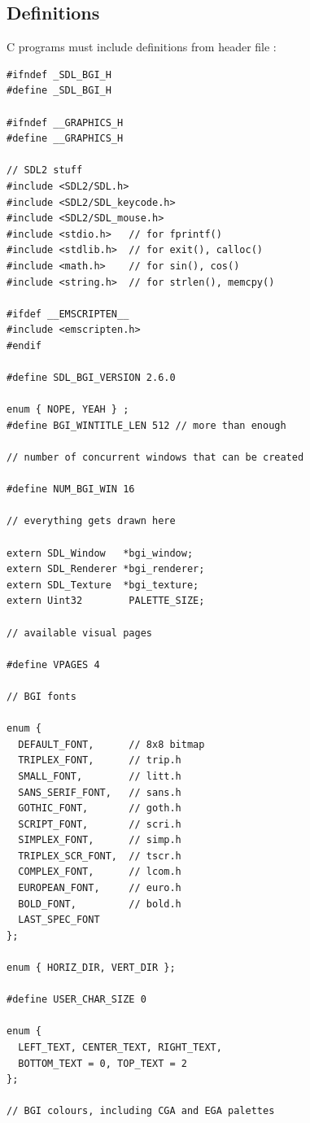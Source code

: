 \documentclass[a4paper,12pt]{article}
\newcommand{\ntt}[1]{\texttt{\textls[-40]{#1}}}
\newcommand{\F}[1]{\ntt{#1}}     %
\begin{document}

\subsection{Definitions}

C programs must include definitions from header file \F{SDL\_bgi.h}:

\begin{footnotesize}
\begin{spacing}{0.8}
\begin{verbatim}
#ifndef _SDL_BGI_H
#define _SDL_BGI_H

#ifndef __GRAPHICS_H
#define __GRAPHICS_H

// SDL2 stuff
#include <SDL2/SDL.h>
#include <SDL2/SDL_keycode.h>
#include <SDL2/SDL_mouse.h>
#include <stdio.h>   // for fprintf()
#include <stdlib.h>  // for exit(), calloc()
#include <math.h>    // for sin(), cos()
#include <string.h>  // for strlen(), memcpy()

#ifdef __EMSCRIPTEN__
#include <emscripten.h>
#endif

#define SDL_BGI_VERSION 2.6.0

enum { NOPE, YEAH } ;
#define BGI_WINTITLE_LEN 512 // more than enough

// number of concurrent windows that can be created

#define NUM_BGI_WIN 16

// everything gets drawn here

extern SDL_Window   *bgi_window;
extern SDL_Renderer *bgi_renderer;
extern SDL_Texture  *bgi_texture;
extern Uint32        PALETTE_SIZE;

// available visual pages

#define VPAGES 4

// BGI fonts

enum {
  DEFAULT_FONT,      // 8x8 bitmap
  TRIPLEX_FONT,      // trip.h
  SMALL_FONT,        // litt.h
  SANS_SERIF_FONT,   // sans.h
  GOTHIC_FONT,       // goth.h
  SCRIPT_FONT,       // scri.h
  SIMPLEX_FONT,      // simp.h
  TRIPLEX_SCR_FONT,  // tscr.h
  COMPLEX_FONT,      // lcom.h
  EUROPEAN_FONT,     // euro.h
  BOLD_FONT,         // bold.h
  LAST_SPEC_FONT
};

enum { HORIZ_DIR, VERT_DIR };

#define USER_CHAR_SIZE 0

enum {
  LEFT_TEXT, CENTER_TEXT, RIGHT_TEXT,
  BOTTOM_TEXT = 0, TOP_TEXT = 2
};

// BGI colours, including CGA and EGA palettes


\end{verbatim}
\end{spacing}
\end{footnotesize}
\end{document}
